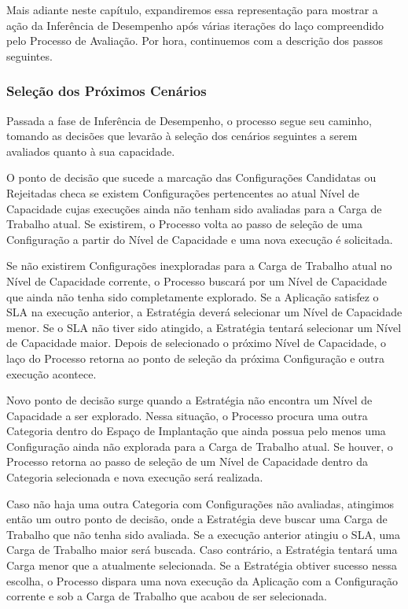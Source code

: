\documentclass[12pt]{article}
\begin{document}
Mais adiante neste capítulo, expandiremos essa representação para mostrar a ação
da Inferência de Desempenho após várias iterações do laço compreendido pelo 
Processo de Avaliação. Por hora, continuemos com a descrição dos passos seguintes.

\subsubsection{Seleção dos Próximos Cenários}
\label{subsec:selecao_cenarios}
Passada a fase de Inferência de Desempenho, o processo segue seu caminho, tomando
as decisões que levarão à seleção dos cenários seguintes a serem avaliados quanto
à sua capacidade.

O ponto de decisão que sucede a marcação das Configurações Candidatas ou Rejeitadas
checa se existem Configurações pertencentes ao atual Nível de Capacidade cujas 
execuções ainda não tenham sido avaliadas para a Carga de Trabalho atual. Se 
existirem, o Processo volta ao passo de seleção de uma Configuração a partir do 
Nível de Capacidade e uma nova execução é solicitada.

Se não existirem Configurações inexploradas para a Carga de Trabalho atual no
Nível de Capacidade corrente, o Processo buscará por um Nível de Capacidade que 
ainda não tenha sido completamente explorado. Se a Aplicação satisfez o SLA na 
execução anterior, a Estratégia deverá selecionar um Nível de Capacidade menor. 
Se o SLA não tiver sido atingido, a Estratégia tentará selecionar um  Nível de 
Capacidade maior. Depois de selecionado o próximo Nível de Capacidade, o laço do
Processo retorna ao ponto de seleção da próxima Configuração e outra execução 
acontece.
   
Novo ponto de decisão surge quando a Estratégia não encontra um Nível de 
Capacidade a ser explorado. Nessa situação, o Processo procura uma outra
Categoria dentro do Espaço de Implantação que ainda possua pelo menos uma
Configuração ainda não explorada para a Carga de Trabalho atual. Se houver,
o Processo retorna ao passo de seleção de um Nível de Capacidade dentro da
Categoria selecionada e nova execução será realizada.

Caso não haja uma outra Categoria com Configurações não avaliadas, atingimos
então um outro ponto de decisão, onde a Estratégia deve buscar uma Carga 
de Trabalho que não tenha sido avaliada. Se a execução anterior atingiu o SLA,
uma Carga de Trabalho maior será buscada. Caso contrário, a Estratégia tentará
uma Carga menor que a atualmente selecionada. Se a Estratégia obtiver sucesso
nessa escolha, o Processo dispara uma nova execução da Aplicação com a Configuração
corrente e sob a Carga de Trabalho que acabou de ser selecionada.
\end{document}
